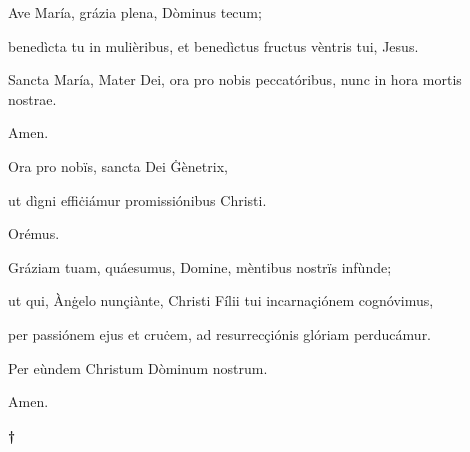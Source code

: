 \documentclass[twoside,10pt]{article}
\begin{document}
{  \noindent Ave María, grázia plena, Dòminus tecum;
  
  benedìcta tu in mulièribus, et benedìctus fructus vèntris tui, Jesus.

  Sancta María, Mater Dei, ora pro nobis peccatóribus, nunc in hora mortis nostrae.

  Amen.

  \bigskip

   Ora pro nobïs, sancta Dei Ġènetrix,

  \smallskip

   ut dìgni effiċiámur promissiónibus Christi.

  \bigskip

   Orémus.

  \bigskip

  \noindent Gráziam tuam, quáesumus, Domine, mèntibus nostrïs infùnde;

  ut qui, Ànġelo nunçiànte, Christi Fílii tui incarnaçiónem cognóvimus,

  per passiónem ejus et cruċem, ad resurrecçiónis glóriam perducámur.

  Per eùndem Christum Dòminum nostrum.

  \bigskip

   Amen.

  \bigskip
  \medskip

  \begin{center}
  {\bfseries\large †}
  \end{center}

}
\end{document}
